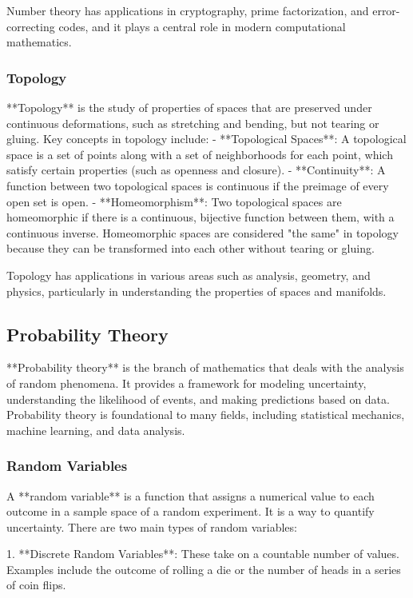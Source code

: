 \documentclass{article}
\begin{document}
Number theory has applications in cryptography, prime factorization, and error-correcting codes, and it plays a central role in modern computational mathematics.

\subsubsection*{Topology}

**Topology** is the study of properties of spaces that are preserved under continuous deformations, such as stretching and bending, but not tearing or gluing. Key concepts in topology include:
- **Topological Spaces**: A topological space is a set of points along with a set of neighborhoods for each point, which satisfy certain properties (such as openness and closure).
- **Continuity**: A function between two topological spaces is continuous if the preimage of every open set is open.
- **Homeomorphism**: Two topological spaces are homeomorphic if there is a continuous, bijective function between them, with a continuous inverse. Homeomorphic spaces are considered "the same" in topology because they can be transformed into each other without tearing or gluing.

Topology has applications in various areas such as analysis, geometry, and physics, particularly in understanding the properties of spaces and manifolds.

\subsection{Probability Theory}

**Probability theory** is the branch of mathematics that deals with the analysis of random phenomena. It provides a framework for modeling uncertainty, understanding the likelihood of events, and making predictions based on data. Probability theory is foundational to many fields, including statistical mechanics, machine learning, and data analysis.

\subsubsection*{Random Variables}

A **random variable** is a function that assigns a numerical value to each outcome in a sample space of a random experiment. It is a way to quantify uncertainty. There are two main types of random variables:

1. **Discrete Random Variables**: These take on a countable number of values. Examples include the outcome of rolling a die or the number of heads in a series of coin flips.
\end{document}
